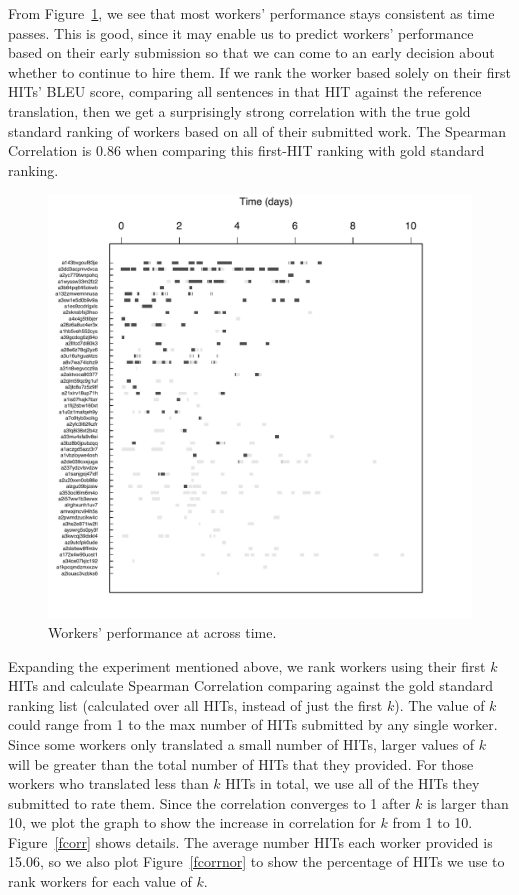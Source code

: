 \documentclass[11pt]{article}
\begin{document}
From Figure~\ref{fworkerperf}, we see that most workers' performance stays
consistent as time passes. This is good, since it may enable us to predict workers' performance based on their early submission so that we can come to an early decision about whether to continue to hire them.  If we rank the worker based solely on their first HITs' BLEU score, comparing all sentences in that HIT against the reference translation, then we get a surprisingly strong correlation with the true gold standard ranking of workers based on all of their submitted work. The Spearman Correlation is 0.86 when comparing this first-HIT ranking with gold standard ranking.
\begin{figure}[htbp]
  \centering
  \includegraphics[width=\linewidth]{WorkerPerf/workerperform.pdf}
  \caption{Workers' performance  at across time.}
    \label{fworkerperf}
\end{figure}

Expanding the experiment mentioned above, we rank workers using their first $k$ HITs and calculate Spearman Correlation comparing against the gold standard ranking list (calculated over all HITs, instead of just the first $k$). The value of $k$ could range from 1 to the max number of HITs submitted by any single worker. Since some workers only translated a small number of HITs, larger values of $k$ will be greater than the total number of HITs that they provided. For those workers who translated less than $k$ HITs in total, we use all of the HITs they submitted to rate them.  Since the correlation converges to 1 after $k$ is larger than 10, we plot the graph to show the increase in correlation for $k$ from  1 to 10. Figure~\ref{fcorr} shows details.  The average number HITs each worker provided is 15.06, so we also plot Figure~\ref{fcorrnor} to show the percentage of HITs we use to rank workers for each value of $k$.
\end{document}
